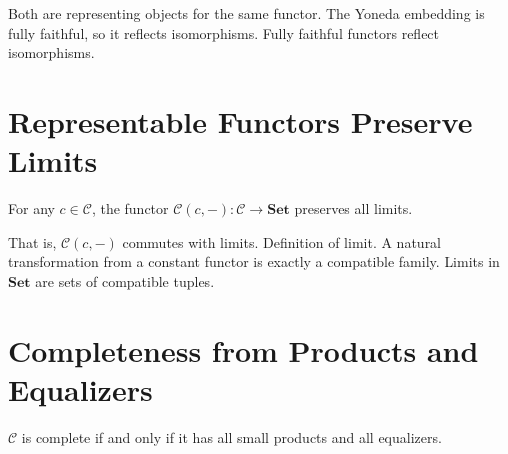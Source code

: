 \begin{prooflog}
           {Both are representing objects for the same functor.}
           {The Yoneda embedding is fully faithful, so it reflects isomorphisms.}
           {Fully faithful functors reflect isomorphisms.}
\end{prooflog}

\section{Representable Functors Preserve Limits}

\begin{theorem}
For any $c \in \mathcal{C}$, the functor $\mathcal{C}(c,-) : \mathcal{C} \to \mathbf{Set}$
preserves all limits.
\end{theorem}

\begin{prooflog}
           {That is, $\mathcal{C}(c,-)$ commutes with limits.}
           {Definition of limit.}
           {A natural transformation from a constant functor is exactly a compatible family.}
           {Limits in $\mathbf{Set}$ are sets of compatible tuples.}
\end{prooflog}

\section{Completeness from Products and Equalizers}

\begin{theorem}
$\mathcal{C}$ is complete if and only if it has all small products and all equalizers.
\end{theorem}


